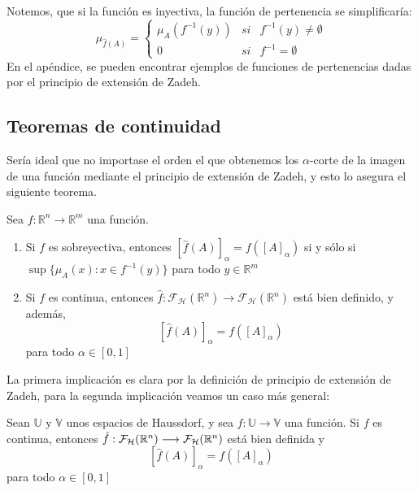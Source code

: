 Notemos, que si la función es inyectiva, la función de pertenencia se simplificaría:
$$
	\mu_{\hat{f}(A)}=\left\{
		\begin{array}{ccc}
			\mu_A(f^{-1}(y)) & si & f^{-1}(y)\neq\emptyset\\
			0 & si & f^{-1}=\emptyset
		\end{array}
	\right.
$$
En el apéndice, se pueden encontrar ejemplos de funciones de pertenencias dadas por el principio de extensión de Zadeh.

\subsection{Teoremas de continuidad}
Sería ideal que no importase el orden el que obtenemos los $\alpha$-corte de la imagen de una función mediante el principio de extensión de Zadeh, y esto lo asegura el siguiente teorema.

\begin{teorema}
	Sea $f : \mathbb{R}^n \longrightarrow \mathbb{R}^m$ una función.
	\begin{enumerate}
		\item Si $f$ es sobreyectiva, entonces $[\hat{f}(A)]_\alpha = f([A]_\alpha)$ si y sólo si $\sup\{\mu_A(x) : x \in f^{-1}(y)\}$ para todo $y \in \mathbb{R}^m$
		\item Si $f$ es continua, entonces $\hat{f} : \mathcal{F}_\mathcal{H}(\mathbb{R}^n) \longrightarrow \mathcal{F}_\mathcal{H}(\mathbb{R}^n)$ está bien definido, y además,  
		$$[\hat{f}(A)]_\alpha = f([A]_\alpha)$$
		para todo $\alpha \in [0, 1]$
	\end{enumerate}
\end{teorema}

La primera implicación es clara por la definición de principio de extensión de Zadeh, para la segunda implicación veamos un caso más general:


\begin{teorema}
	Sean $\mathbb{U}$ y $\mathbb{V}$ unos espacios de Haussdorf, y sea $f: \mathbb{U} \longrightarrow \mathbb{V}$ una función. Si $f$ es continua, entonces  $\hat{f} : \mathcal{F}_\mathcal{H}(\mathbb R^n) \longrightarrow \mathcal{F}_\mathcal{H}(\mathbb R^n)$ está bien definida y $$[\hat{f}(A)]_\alpha = f([A]_\alpha)$$
	para todo $\alpha \in [0, 1]$
\end{teorema}

